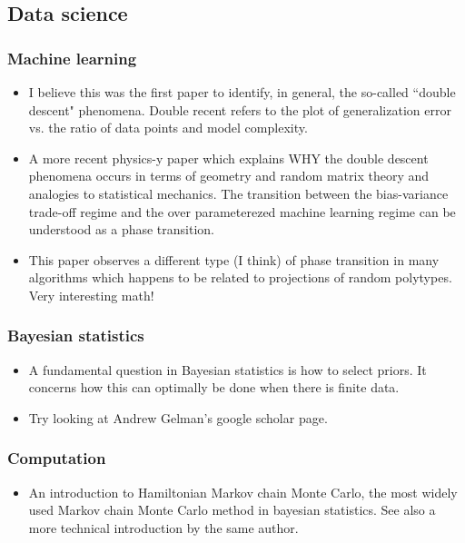 \documentclass{amsart}
\begin{document}
\subsection{Data science}
\subsubsection{Machine learning}
\begin{itemize}
\item \cite{Belkin2019} I believe this was the first paper to identify, in general, the so-called ``double descent" phenomena. Double recent refers to the plot of generalization error vs. the ratio of data points and model complexity. 
\item \cite{rocks2022memorizing} A more recent physics-y paper which explains WHY the double descent phenomena occurs in terms of geometry and random matrix theory and analogies to statistical mechanics. The transition between the bias-variance trade-off regime and the over parameterezed machine learning regime can be understood as a phase transition. 
\item \cite{donoho2009observed} This paper observes a different type (I think) of phase transition in many algorithms which happens to be related to projections of random polytypes. Very interesting math! 
\end{itemize}

\subsubsection{Bayesian statistics}
\begin{itemize}
\item \cite{mattingly2018maximizing} A fundamental question in Bayesian statistics is how to select priors. It concerns how this can optimally be done when there is finite data. 
\item Try looking at Andrew Gelman's google scholar page. 
\end{itemize}


\subsubsection{Computation}

\begin{itemize}
\item \cite{Betancourt2017aa} An introduction to Hamiltonian Markov chain Monte Carlo, the most widely used Markov chain Monte Carlo method in bayesian statistics. See also a more technical introduction by the same author.
\end{itemize}
\end{document}
